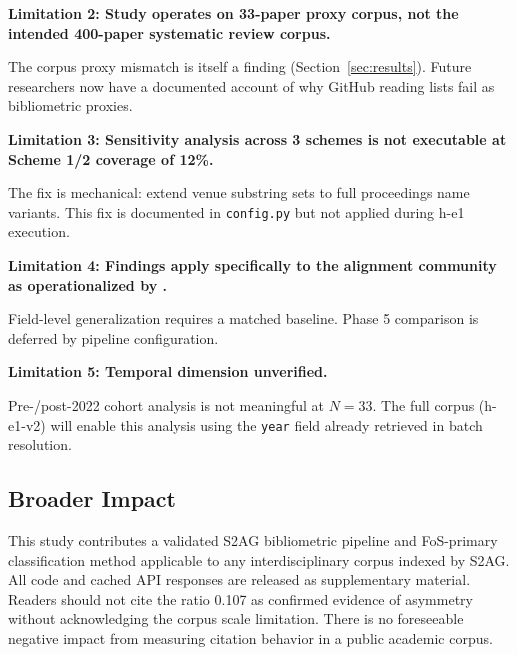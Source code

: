 \textbf{Limitation 2: Study operates on 33-paper proxy corpus, not the intended 400-paper systematic review corpus.}

The corpus proxy mismatch is itself a finding (Section~\ref{sec:results}).
Future researchers now have a documented account of why GitHub reading lists fail as bibliometric proxies.

\textbf{Limitation 3: Sensitivity analysis across 3 schemes is not executable at Scheme 1/2 coverage of 12\%.}

The fix is mechanical: extend venue substring sets to full proceedings name variants.
This fix is documented in \texttt{config.py} but not applied during h-e1 execution.

\textbf{Limitation 4: Findings apply specifically to the alignment community as operationalized by \citet{Shen2024Position}.}

Field-level generalization requires a matched baseline.
Phase 5 comparison is deferred by pipeline configuration.

\textbf{Limitation 5: Temporal dimension unverified.}

Pre-/post-2022 cohort analysis is not meaningful at $N=33$.
The full corpus (h-e1-v2) will enable this analysis using the \texttt{year} field already retrieved in batch resolution.

\subsection{Broader Impact}

This study contributes a validated S2AG bibliometric pipeline and FoS-primary classification method applicable to any interdisciplinary corpus indexed by S2AG.
All code and cached API responses are released as supplementary material.
Readers should not cite the ratio 0.107 as confirmed evidence of asymmetry without acknowledging the corpus scale limitation.
There is no foreseeable negative impact from measuring citation behavior in a public academic corpus.
